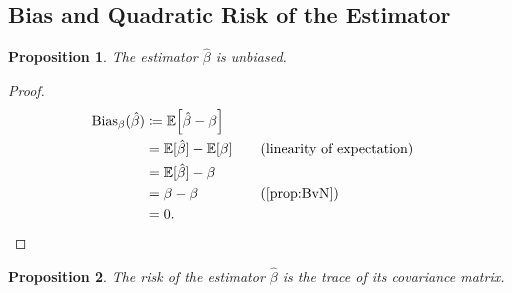 \documentclass[letterpaper, reqno]{amsart}
\newtheorem{prop}{Proposition}[section]
\numberwithin{equation}{section}
\newcommand{\E}[1]{\mathbb{E}\mleft[#1\mright]}
\newcommand{\by}[1]{&\quad&\text{(#1)}}
\newcommand{\Bv}{\beta}
\newcommand{\Bvh}{\hat{\beta}}
\newcommand{\Ebh}{\mathbb{E}[\Bvh]}
\begin{document}
\subsection{Bias and Quadratic Risk of the Estimator}
\begin{prop} \label{prop:bhat_nobias}
  The estimator $\Bvh$ is unbiased.
\end{prop}

\begin{proof}
  \begin{alignat*}{3}
    \mathrm{Bias}_\Bv(\Bvh) &\coloneqq \E{\Bvh - \Bv} \\
    &= \Ebh - \E{\Bv} \by{linearity of expectation} \\
    &= \Ebh - \Bv \\
    &= \Bv - \Bv \by{\Cref{prop:BvN}} \\
    &= 0. \tag*{\qedhere}
  \end{alignat*}
\end{proof}

\begin{prop}
  The risk of the estimator $\Bvh$ is the trace of its covariance matrix.
\end{prop}
\end{document}
